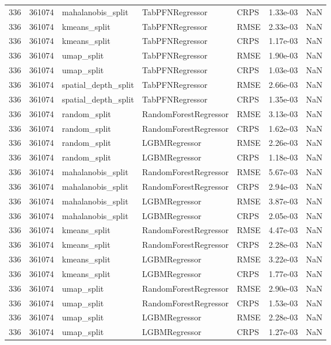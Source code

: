 \begin{tabular}{rrlllrr}
336 & 361074 & mahalanobis\_split & TabPFNRegressor & CRPS & 1.33e-03 & NaN \\
336 & 361074 & kmeans\_split & TabPFNRegressor & RMSE & 2.33e-03 & NaN \\
336 & 361074 & kmeans\_split & TabPFNRegressor & CRPS & 1.17e-03 & NaN \\
336 & 361074 & umap\_split & TabPFNRegressor & RMSE & 1.90e-03 & NaN \\
336 & 361074 & umap\_split & TabPFNRegressor & CRPS & 1.03e-03 & NaN \\
336 & 361074 & spatial\_depth\_split & TabPFNRegressor & RMSE & 2.66e-03 & NaN \\
336 & 361074 & spatial\_depth\_split & TabPFNRegressor & CRPS & 1.35e-03 & NaN \\
336 & 361074 & random\_split & RandomForestRegressor & RMSE & 3.13e-03 & NaN \\
336 & 361074 & random\_split & RandomForestRegressor & CRPS & 1.62e-03 & NaN \\
336 & 361074 & random\_split & LGBMRegressor & RMSE & 2.26e-03 & NaN \\
336 & 361074 & random\_split & LGBMRegressor & CRPS & 1.18e-03 & NaN \\
336 & 361074 & mahalanobis\_split & RandomForestRegressor & RMSE & 5.67e-03 & NaN \\
336 & 361074 & mahalanobis\_split & RandomForestRegressor & CRPS & 2.94e-03 & NaN \\
336 & 361074 & mahalanobis\_split & LGBMRegressor & RMSE & 3.87e-03 & NaN \\
336 & 361074 & mahalanobis\_split & LGBMRegressor & CRPS & 2.05e-03 & NaN \\
336 & 361074 & kmeans\_split & RandomForestRegressor & RMSE & 4.47e-03 & NaN \\
336 & 361074 & kmeans\_split & RandomForestRegressor & CRPS & 2.28e-03 & NaN \\
336 & 361074 & kmeans\_split & LGBMRegressor & RMSE & 3.22e-03 & NaN \\
336 & 361074 & kmeans\_split & LGBMRegressor & CRPS & 1.77e-03 & NaN \\
336 & 361074 & umap\_split & RandomForestRegressor & RMSE & 2.90e-03 & NaN \\
336 & 361074 & umap\_split & RandomForestRegressor & CRPS & 1.53e-03 & NaN \\
336 & 361074 & umap\_split & LGBMRegressor & RMSE & 2.28e-03 & NaN \\
336 & 361074 & umap\_split & LGBMRegressor & CRPS & 1.27e-03 & NaN \\

\end{tabular}
